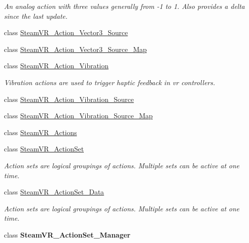 \begin{DoxyCompactItemize}
\begin{DoxyCompactList}\small\item\em An analog action with three values generally from -\/1 to 1. Also provides a delta since the last update. \end{DoxyCompactList}\item 
class \mbox{\hyperlink{class_valve_1_1_v_r_1_1_steam_v_r___action___vector3___source}{Steam\+V\+R\+\_\+\+Action\+\_\+\+Vector3\+\_\+\+Source}}
\item 
class \mbox{\hyperlink{class_valve_1_1_v_r_1_1_steam_v_r___action___vector3___source___map}{Steam\+V\+R\+\_\+\+Action\+\_\+\+Vector3\+\_\+\+Source\+\_\+\+Map}}
\item 
class \mbox{\hyperlink{class_valve_1_1_v_r_1_1_steam_v_r___action___vibration}{Steam\+V\+R\+\_\+\+Action\+\_\+\+Vibration}}
\begin{DoxyCompactList}\small\item\em Vibration actions are used to trigger haptic feedback in vr controllers. \end{DoxyCompactList}\item 
class \mbox{\hyperlink{class_valve_1_1_v_r_1_1_steam_v_r___action___vibration___source}{Steam\+V\+R\+\_\+\+Action\+\_\+\+Vibration\+\_\+\+Source}}
\item 
class \mbox{\hyperlink{class_valve_1_1_v_r_1_1_steam_v_r___action___vibration___source___map}{Steam\+V\+R\+\_\+\+Action\+\_\+\+Vibration\+\_\+\+Source\+\_\+\+Map}}
\item 
class \mbox{\hyperlink{class_valve_1_1_v_r_1_1_steam_v_r___actions}{Steam\+V\+R\+\_\+\+Actions}}
\item 
class \mbox{\hyperlink{class_valve_1_1_v_r_1_1_steam_v_r___action_set}{Steam\+V\+R\+\_\+\+Action\+Set}}
\begin{DoxyCompactList}\small\item\em Action sets are logical groupings of actions. Multiple sets can be active at one time. \end{DoxyCompactList}\item 
class \mbox{\hyperlink{class_valve_1_1_v_r_1_1_steam_v_r___action_set___data}{Steam\+V\+R\+\_\+\+Action\+Set\+\_\+\+Data}}
\begin{DoxyCompactList}\small\item\em Action sets are logical groupings of actions. Multiple sets can be active at one time. \end{DoxyCompactList}\item 
class {\bfseries Steam\+V\+R\+\_\+\+Action\+Set\+\_\+\+Manager}

\end{DoxyCompactItemize}
